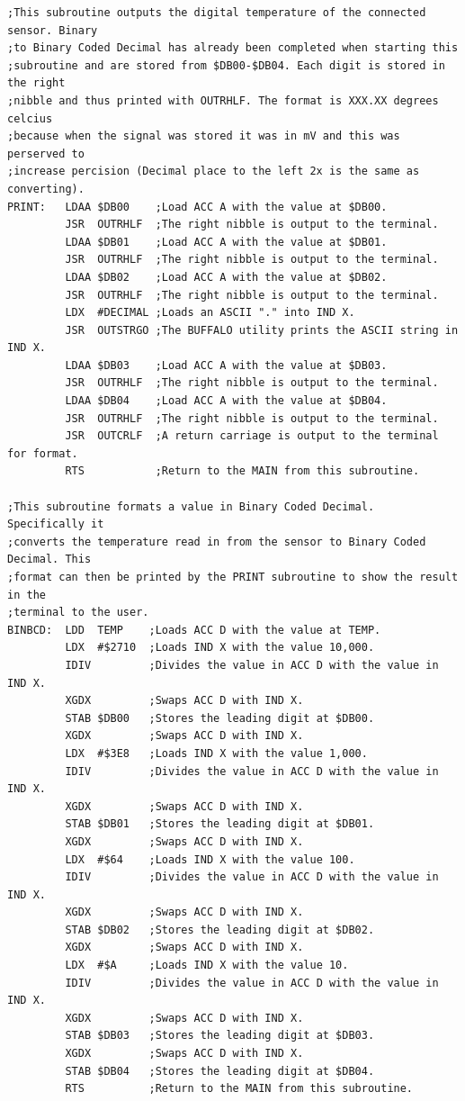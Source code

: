 \documentclass[12pt]{report}
\begin{document}
\begin{Verbatim}[frame=single, fontsize=\small]
;This subroutine outputs the digital temperature of the connected sensor. Binary
;to Binary Coded Decimal has already been completed when starting this
;subroutine and are stored from $DB00-$DB04. Each digit is stored in the right
;nibble and thus printed with OUTRHLF. The format is XXX.XX degrees celcius
;because when the signal was stored it was in mV and this was perserved to
;increase percision (Decimal place to the left 2x is the same as converting).
PRINT:   LDAA $DB00    ;Load ACC A with the value at $DB00.
         JSR  OUTRHLF  ;The right nibble is output to the terminal.
         LDAA $DB01    ;Load ACC A with the value at $DB01.
         JSR  OUTRHLF  ;The right nibble is output to the terminal.
         LDAA $DB02    ;Load ACC A with the value at $DB02.
         JSR  OUTRHLF  ;The right nibble is output to the terminal.
         LDX  #DECIMAL ;Loads an ASCII "." into IND X.
         JSR  OUTSTRGO ;The BUFFALO utility prints the ASCII string in IND X.
         LDAA $DB03    ;Load ACC A with the value at $DB03.
         JSR  OUTRHLF  ;The right nibble is output to the terminal.
         LDAA $DB04    ;Load ACC A with the value at $DB04.
         JSR  OUTRHLF  ;The right nibble is output to the terminal.
         JSR  OUTCRLF  ;A return carriage is output to the terminal for format.
         RTS           ;Return to the MAIN from this subroutine.

;This subroutine formats a value in Binary Coded Decimal.  Specifically it
;converts the temperature read in from the sensor to Binary Coded Decimal. This
;format can then be printed by the PRINT subroutine to show the result in the
;terminal to the user.
BINBCD:  LDD  TEMP    ;Loads ACC D with the value at TEMP.
         LDX  #$2710  ;Loads IND X with the value 10,000.
         IDIV         ;Divides the value in ACC D with the value in IND X.
         XGDX         ;Swaps ACC D with IND X.
         STAB $DB00   ;Stores the leading digit at $DB00.
         XGDX         ;Swaps ACC D with IND X.
         LDX  #$3E8   ;Loads IND X with the value 1,000.
         IDIV         ;Divides the value in ACC D with the value in IND X.
         XGDX         ;Swaps ACC D with IND X.
         STAB $DB01   ;Stores the leading digit at $DB01.
         XGDX         ;Swaps ACC D with IND X.
         LDX  #$64    ;Loads IND X with the value 100.
         IDIV         ;Divides the value in ACC D with the value in IND X.
         XGDX         ;Swaps ACC D with IND X.
         STAB $DB02   ;Stores the leading digit at $DB02.
         XGDX         ;Swaps ACC D with IND X.
         LDX  #$A     ;Loads IND X with the value 10.
         IDIV         ;Divides the value in ACC D with the value in IND X.
         XGDX         ;Swaps ACC D with IND X.
         STAB $DB03   ;Stores the leading digit at $DB03.
         XGDX         ;Swaps ACC D with IND X.
         STAB $DB04   ;Stores the leading digit at $DB04.
         RTS          ;Return to the MAIN from this subroutine.


\end{Verbatim}
\end{document}
